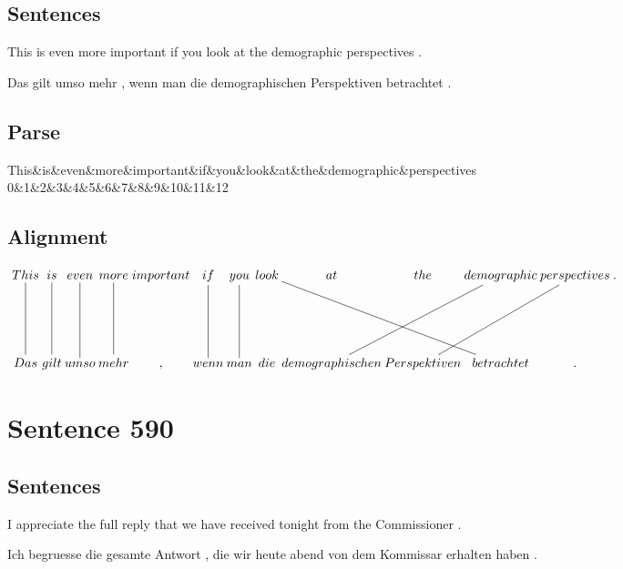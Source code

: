 \documentclass{report}
\begin{document}
\subsection*{Sentences}
This is even more important if you look at the demographic perspectives .

\noindent Das gilt umso mehr , wenn man die demographischen Perspektiven betrachtet .



\subsection*{Parse}
\begin{dependency}[theme=simple]
\begin{deptext}[column sep=.5cm, row sep=.1ex]
This\&is\&even\&more\&important\&if\&you\&look\&at\&the\&demographic\&perspectives\\
0\&1\&2\&3\&4\&5\&6\&7\&8\&9\&10\&11\&12\\
\end{deptext}
\end{dependency}


\subsection*{Alignment}
\scriptsize{
$
\xymatrix@C-2.3pc{
This \ar @{-} [dd] & is \ar @{-} [dd] & even \ar @{-} [dd] & more \ar @{-} [dd] & important & if \ar @{-} [dd] & you \ar @{-} [dd] & look \ar @{-} [ddrrr] & at & the & demographic \ar @{-} [ddll] & perspectives \ar @{-} [ddll] & .\\\\
Das & gilt & umso & mehr & , & wenn & man & die & demographischen & Perspektiven & betrachtet & .
}$}
\newpage\section*{Sentence 590}

\subsection*{Sentences}
I appreciate the full reply that we have received tonight from the Commissioner .

\noindent Ich begruesse die gesamte Antwort , die wir heute abend von dem Kommissar erhalten haben .
\end{document}
